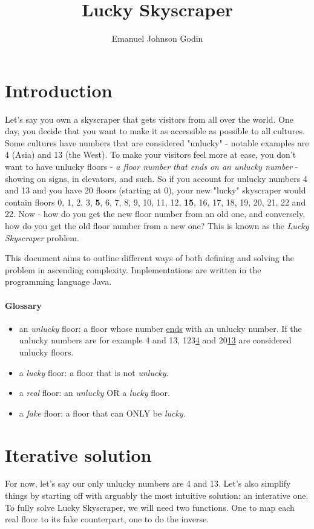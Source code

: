 \documentclass{article}
\title{Lucky Skyscraper}
\author{Emanuel Johnson Godin}
\begin{document}
\maketitle

\section{Introduction}

Let's say you own a skyscraper that gets visitors from all over the world. One day, you decide that you want to make it as accessible as possible to all cultures. Some cultures have numbers that are considered "unlucky" - notable examples are 4 (Asia) and 13 (the West). To make your visitors feel more at ease, you don't want to have unlucky floors - \textit{a floor number that ends on an unlucky number} - showing on signs, in elevators, and such. So if you account for unlucky numbers 4 and 13 and you have 20 floors (starting at 0), your new "lucky" skyscraper would contain floors 0, 1, 2, 3, \textbf{5}, 6, 7, 8, 9, 10, 11, 12, \textbf{15}, 16, 17, 18, 19, 20, 21, 22 and 22. Now - how do you get the new floor number from an old one, and conversely, how do you get the old floor number from a new one? This is known as the \textit{Lucky Skyscraper} problem.

This document aims to outline different ways of both defining and solving the problem in ascending complexity. Implementations are written in the programming language Java.

\paragraph{Glossary}
\begin{itemize}
  \item an \textit{unlucky} floor: a floor whose number \underline{ends} with an unlucky number. If the unlucky numbers are for example 4 and 13, 123\underline{4} and 20\underline{13} are considered unlucky floors.
  \item a \textit{lucky} floor: a floor that is not \textit{unlucky}.
  \item a \textit{real} floor: an \textit{unlucky} OR a \textit{lucky} floor.
  \item a \textit{fake} floor: a floor that can ONLY be \textit{lucky}.  
\end{itemize}

\section{Iterative solution}
For now, let's say our only unlucky numbers are 4 and 13. Let's also simplify things by starting off with arguably the most intuitive solution: an interative one. To fully solve Lucky Skyscraper, we will need two functions. One to map each real floor to its fake counterpart, one to do the inverse. 
\end{document}
